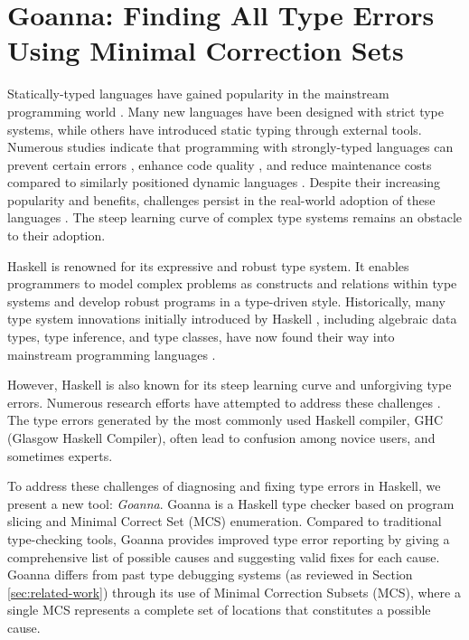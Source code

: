 
\chapter{Goanna: Finding All Type Errors Using Minimal Correction Sets} \label{chap:goanna} 

Statically-typed languages have gained popularity in the mainstream programming world \cite{stack_exchange_inc_stack_nodate}. Many new languages have been designed with strict type systems, while others have introduced static typing through external tools. Numerous studies indicate that programming with strongly-typed languages can prevent certain errors \cite{bogner_type_2022}, enhance code quality \cite{mayer_empirical_2012}, and reduce maintenance costs \cite{kleinschmager_static_2012} compared to similarly positioned dynamic languages \cite{bogner_type_2022}. Despite their increasing popularity and benefits, challenges persist in the real-world adoption of these languages \cite{zeng_identifying_2019}. The steep learning curve of complex type systems remains an obstacle to their adoption. 

Haskell is renowned for its expressive and robust type system. It enables programmers to model complex problems as constructs and relations within type systems and develop robust programs in a type-driven style. Historically, many type system innovations initially introduced by Haskell \cite{hudak_history_2007}, including algebraic data types, type inference, and type classes, have now found their way into mainstream programming languages \cite{noauthor_introduction_nodate,noauthor_documentation_nodate,noauthor_defining_nodate}.
    
However, Haskell is also known for its steep learning curve and unforgiving type errors. Numerous research efforts have attempted to address these challenges \cite{tirronen_understanding_2015,chen_counter-factual_2014,heeren_helium_2003,zhang_diagnosing_nodate,zhang_sherrloc_2017,lerner_searching_2007}. The type errors generated by the most commonly used Haskell compiler, GHC (Glasgow Haskell Compiler), often lead to confusion among novice users, and sometimes experts.

    To address these challenges of diagnosing and fixing type errors in Haskell, we present a new tool: \textit{Goanna}. Goanna is a Haskell type checker based on program slicing and Minimal Correct Set (MCS) enumeration. Compared to traditional type-checking tools, Goanna provides improved type error reporting by giving a comprehensive list of possible causes and suggesting valid fixes for each cause.  Goanna differs from past type debugging systems (as reviewed in Section \ref{sec:related-work}) through its use of Minimal Correction Subsets (MCS), where a single MCS represents a complete set of locations that constitutes a possible cause.

